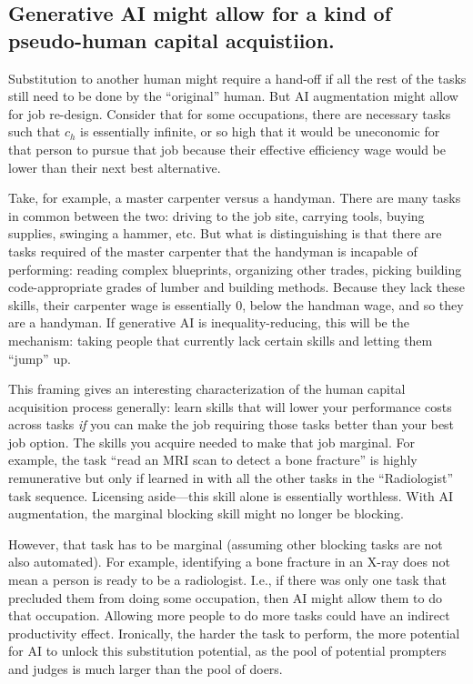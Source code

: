 \documentclass{article}
\begin{document}
\subsection{Generative AI might allow for a kind of pseudo-human capital acquistiion.}
Substitution to another human might require a hand-off if all the rest of the tasks still need to be done by the ``original'' human. 
But AI augmentation might allow for job re-design. 
Consider that for some occupations, there are necessary tasks such that $c_h$ is essentially infinite, or so high that it would be uneconomic for that person to pursue that job because their effective efficiency wage would be lower than their next best alternative.  

Take, for example, a master carpenter versus a handyman.
There are many tasks in common between the two: driving to the job site, carrying tools, buying supplies, swinging a hammer, etc.
But what is distinguishing is that there are tasks required of the master carpenter that the handyman is incapable of performing: 
reading complex blueprints, organizing other trades, picking building code-appropriate grades of lumber and building methods.
Because they lack these skills, their carpenter wage is essentially 0, below the handman wage, and so they are a handyman.
If generative AI is inequality-reducing, this will be the mechanism: taking people that currently lack certain skills and letting them ``jump'' up. 

This framing gives an interesting characterization of the human capital acquisition process generally: 
learn skills that will lower your performance costs across tasks \emph{if} you can make the job requiring those tasks better than your best job option.
The skills you acquire needed to make that job marginal. 
For example, the task ``read an MRI scan to detect a bone fracture'' is highly remunerative but only if learned in with all the other tasks in the ``Radiologist'' task sequence.
Licensing aside---this skill alone is essentially worthless.  
With AI augmentation, the marginal blocking skill might no longer be blocking. 

However, that task has to be marginal (assuming other blocking tasks are not also automated). 
For example, identifying a bone fracture in an X-ray does not mean a person is ready to be a radiologist.
I.e., if there was only one task that precluded them from doing some occupation, then AI might allow them to do that occupation.
Allowing more people to do more tasks could have an indirect productivity effect. 
Ironically, the harder the task to perform, the more potential for AI to unlock this substitution potential, as the pool of potential prompters and judges is much larger than the pool of doers.
\end{document}
